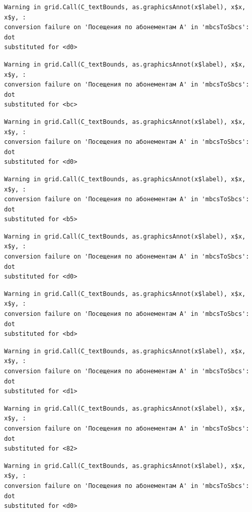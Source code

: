 \documentclass[
  letterpaper,
  DIV=11,
  numbers=noendperiod]{scrartcl}
\begin{document}
\begin{verbatim}
Warning in grid.Call(C_textBounds, as.graphicsAnnot(x$label), x$x, x$y, :
conversion failure on 'Посещения по абонементам А' in 'mbcsToSbcs': dot
substituted for <d0>
\end{verbatim}

\begin{verbatim}
Warning in grid.Call(C_textBounds, as.graphicsAnnot(x$label), x$x, x$y, :
conversion failure on 'Посещения по абонементам А' in 'mbcsToSbcs': dot
substituted for <bc>
\end{verbatim}

\begin{verbatim}
Warning in grid.Call(C_textBounds, as.graphicsAnnot(x$label), x$x, x$y, :
conversion failure on 'Посещения по абонементам А' in 'mbcsToSbcs': dot
substituted for <d0>
\end{verbatim}

\begin{verbatim}
Warning in grid.Call(C_textBounds, as.graphicsAnnot(x$label), x$x, x$y, :
conversion failure on 'Посещения по абонементам А' in 'mbcsToSbcs': dot
substituted for <b5>
\end{verbatim}

\begin{verbatim}
Warning in grid.Call(C_textBounds, as.graphicsAnnot(x$label), x$x, x$y, :
conversion failure on 'Посещения по абонементам А' in 'mbcsToSbcs': dot
substituted for <d0>
\end{verbatim}

\begin{verbatim}
Warning in grid.Call(C_textBounds, as.graphicsAnnot(x$label), x$x, x$y, :
conversion failure on 'Посещения по абонементам А' in 'mbcsToSbcs': dot
substituted for <bd>
\end{verbatim}

\begin{verbatim}
Warning in grid.Call(C_textBounds, as.graphicsAnnot(x$label), x$x, x$y, :
conversion failure on 'Посещения по абонементам А' in 'mbcsToSbcs': dot
substituted for <d1>
\end{verbatim}

\begin{verbatim}
Warning in grid.Call(C_textBounds, as.graphicsAnnot(x$label), x$x, x$y, :
conversion failure on 'Посещения по абонементам А' in 'mbcsToSbcs': dot
substituted for <82>
\end{verbatim}

\begin{verbatim}
Warning in grid.Call(C_textBounds, as.graphicsAnnot(x$label), x$x, x$y, :
conversion failure on 'Посещения по абонементам А' in 'mbcsToSbcs': dot
substituted for <d0>
\end{verbatim}
\end{document}
